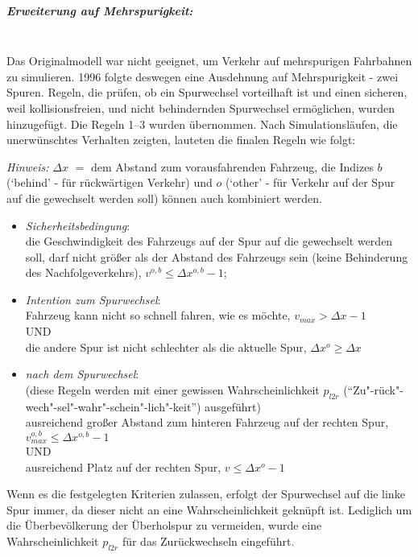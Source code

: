 \subparagraph{Erweiterung auf Mehrspurigkeit:}
\hfill \\
Das Originalmodell war nicht geeignet, um Verkehr auf mehrspurigen Fahrbahnen zu simulieren. 
1996 folgte deswegen eine Ausdehnung auf Mehrspurigkeit \cite{multi-lane} - zwei Spuren. 
Regeln, die prüfen, ob ein Spurwechsel vorteilhaft ist und einen sicheren, weil kollisionsfreien, und nicht behindernden Spurwechsel ermöglichen, wurden hinzugefügt. Die Regeln 1--3 wurden übernommen. Nach Simulationsläufen, die unerwünschtes Verhalten zeigten, lauteten die finalen Regeln wie folgt:

\textit{Hinweis:} $\Delta x$ $\widehat{=}$ dem Abstand zum vorausfahrenden Fahrzeug, die Indizes $b$ (\enquote*{behind} - für rückwärtigen Verkehr) und $o$ (\enquote*{other} - für Verkehr auf der Spur auf die gewechselt werden soll) können auch kombiniert werden. 

\begin{itemize}
	\item \textit{Sicherheitsbedingung}: 
	\\	
	die Geschwindigkeit des Fahrzeugs auf der Spur auf die gewechselt werden soll, darf nicht größer als der Abstand des Fahrzeugs sein (keine Behinderung des Nachfolgeverkehrs), $v^{o,b} \leq \Delta x^{o,b}-1$;
	\item \textit{Intention zum Spurwechsel}: 
	\\
	Fahrzeug kann nicht so schnell fahren, wie es möchte, $v_{max} > \Delta x-1$ \\
	UND\\
	die andere Spur ist nicht schlechter als die aktuelle Spur, $\Delta x^{o} \geq \Delta x$
	\item \textit{nach dem Spurwechsel}: 
	\\
	(diese Regeln werden mit einer gewissen Wahrscheinlichkeit $p_{l2r}$ (\enquote{Zu"-rück"-wech"-sel"-wahr"-schein"-lich"-keit}) ausgeführt) \\
	ausreichend großer Abstand zum hinteren Fahrzeug auf der rechten Spur, $v^{o,b}_{max} \leq \Delta x^{o,b}-1$ \\
	UND \\
	ausreichend Platz auf der rechten Spur, $v \leq \Delta x^{o}-1$
\end{itemize}

Wenn es die festgelegten Kriterien zulassen, erfolgt der Spurwechsel auf die linke Spur immer, da dieser nicht an eine Wahrscheinlichkeit geknüpft ist.
Lediglich um die Überbevölkerung der Überholspur zu vermeiden, wurde eine Wahrscheinlichkeit $p_{l2r}$ für das Zurückwechseln eingeführt.

